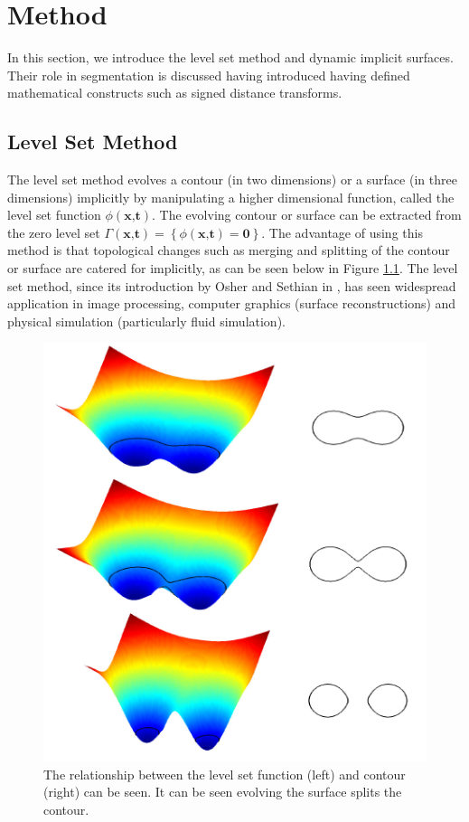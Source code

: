 \chapter{Method}

In this section, we introduce the level set method and dynamic implicit surfaces. Their role in segmentation is discussed having introduced having defined mathematical constructs such as signed distance transforms.

\section{Level Set Method}\label{levelsetmethod}
The level set method evolves a contour (in two dimensions) or a surface (in three dimensions) implicitly by manipulating a higher dimensional function, called the level set function $\phi(\textbf{x,t})$. The evolving contour or surface can be extracted from the zero level set $\Gamma(\textbf{x,t})=\left\{\phi(\textbf{x,t}) = \textbf{0}\right\}$. The advantage of using this method is that topological changes such as merging and splitting of the contour or surface are catered for implicitly, as can be seen below in Figure \ref{fig:levelsets}. The level set method, since its introduction by Osher and Sethian in \cite{oshersethian}, has seen widespread application in image processing, computer graphics (surface reconstructions) and physical simulation (particularly fluid simulation).

	\begin{figure}[h]
		\centering
			\includegraphics[scale=0.4]{images/levelsets.png}
		\caption{The relationship between the level set function (left) and contour (right) can be seen. It can be seen evolving the surface splits the contour.}
		\label{fig:levelsets}
	\end{figure}

